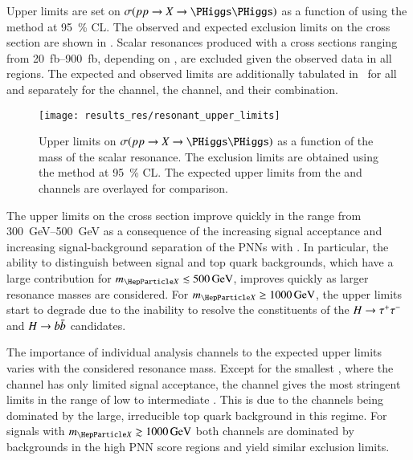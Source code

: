 Upper limits are set on $\sigma(pp \to X \to \HH)$ as a function of \mX using
the \CLs method at \SI{95}{\percent} CL. The observed and expected exclusion
limits on the cross section are shown in . Scalar
resonances produced with a cross sections ranging from
\SIrange{20}{900}{\femto\barn}, depending on \mX, are excluded given the
observed data in all regions. The expected and observed limits are additionally
tabulated in~ for all \mX and separately for the \hadhad
channel, the \lephad channel, and their combination.

\begin{figure}[htbp]
  \centering

  \texttt{[image: results\_res/resonant\_upper\_limits]}

  \caption[Upper limits on $\sigma(pp \to X \to \HH)$ as a function of the mass
  of the scalar resonance.]{Upper limits on $\sigma(pp \to X \to \HH)$ as a
    function of the mass of the scalar resonance. The exclusion limits are
    obtained using the \CLs method at \SI{95}{\percent} CL. The expected upper
    limits from the \hadhad and \lephad channels are overlayed for comparison.}%
  \label{fig:res_upper_limits}
\end{figure}

The upper limits on the cross section improve quickly in the \mX range from
\SIrange{300}{500}{\GeV} as a consequence of the increasing signal acceptance
and increasing signal-background separation of the PNNs with \mX. In particular,
the ability to distinguish between signal and top quark backgrounds, which have
a large contribution for $\mX \lesssim \SI{500}{\GeV}$, improves quickly as
larger resonance masses are considered. For $\mX \geq \SI{1000}{\GeV}$, the
upper limits start to degrade due to the inability to resolve the constituents
of the $H \to \tau^{+} \tau^{-}$ and $H \to b\bar{b}$ candidates.



The importance of individual analysis channels to the expected upper limits
varies with the considered resonance mass. Except for the smallest \mX, where
the \hadhad channel has only limited signal acceptance, the \hadhad channel
gives the most stringent limits in the range of low to intermediate \mX. This is
due to the \lephad channels being dominated by the large, irreducible top quark
background in this regime. For signals with $\mX \gtrsim \SI{1000}{\GeV}$ both
channels are dominated by \Zjets backgrounds in the high PNN score regions and
yield similar exclusion limits.

